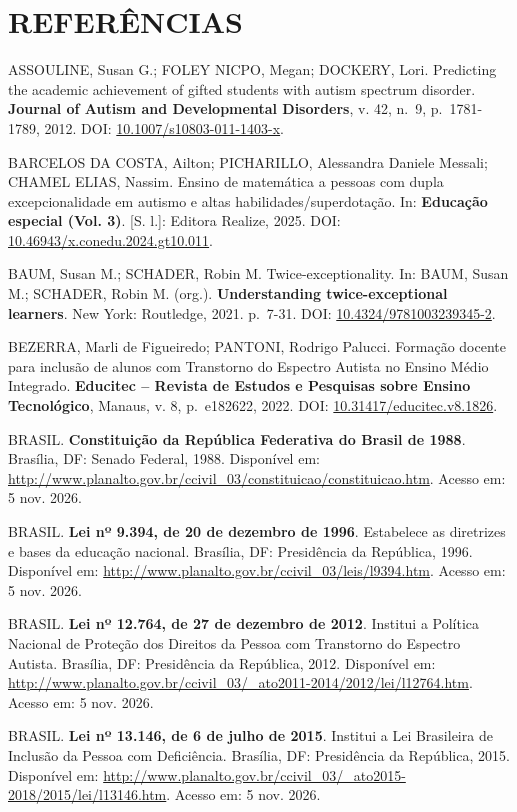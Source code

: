 \section*{REFERÊNCIAS}\label{referuxeancias}

ASSOULINE, Susan G.; FOLEY NICPO, Megan; DOCKERY, Lori. Predicting the
academic achievement of gifted students with autism spectrum disorder.
\textbf{Journal of Autism and Developmental Disorders}, v. 42, n.~9,
p.~1781-1789, 2012. DOI: \url{10.1007/s10803-011-1403-x}.

BARCELOS DA COSTA, Ailton; PICHARILLO, Alessandra Daniele Messali;
CHAMEL ELIAS, Nassim. Ensino de matemática a pessoas com dupla
excepcionalidade em autismo e altas habilidades/superdotação. In:
\textbf{Educação especial (Vol. 3)}. {[}S. l.{]}: Editora Realize, 2025.
DOI: \url{10.46943/x.conedu.2024.gt10.011}.

BAUM, Susan M.; SCHADER, Robin M. Twice-exceptionality. In: BAUM, Susan
M.; SCHADER, Robin M. (org.). \textbf{Understanding twice-exceptional
learners}. New York: Routledge, 2021. p.~7-31. DOI:
\url{10.4324/9781003239345-2}.

BEZERRA, Marli de Figueiredo; PANTONI, Rodrigo Palucci. Formação docente
para inclusão de alunos com Transtorno do Espectro Autista no Ensino
Médio Integrado. \textbf{Educitec -- Revista de Estudos e Pesquisas
sobre Ensino Tecnológico}, Manaus, v. 8, p.~e182622, 2022. DOI:
\url{10.31417/educitec.v8.1826}.

BRASIL. \textbf{Constituição da República Federativa do Brasil de 1988}.
Brasília, DF: Senado Federal, 1988. Disponível em:
\url{http://www.planalto.gov.br/ccivil_03/constituicao/constituicao.htm}.
Acesso em: 5 nov. 2026.

BRASIL. \textbf{Lei nº 9.394, de 20 de dezembro de 1996}. Estabelece as
diretrizes e bases da educação nacional. Brasília, DF: Presidência da
República, 1996. Disponível em:
\url{http://www.planalto.gov.br/ccivil_03/leis/l9394.htm}. Acesso em: 5 nov.
2026.

BRASIL. \textbf{Lei nº 12.764, de 27 de dezembro de 2012}. Institui a
Política Nacional de Proteção dos Direitos da Pessoa com Transtorno do
Espectro Autista. Brasília, DF: Presidência da República, 2012.
Disponível em:
\url{http://www.planalto.gov.br/ccivil_03/_ato2011-2014/2012/lei/l12764.htm}.
Acesso em: 5 nov. 2026.

BRASIL. \textbf{Lei nº 13.146, de 6 de julho de 2015}. Institui a Lei
Brasileira de Inclusão da Pessoa com Deficiência. Brasília, DF:
Presidência da República, 2015. Disponível em:
\url{http://www.planalto.gov.br/ccivil_03/_ato2015-2018/2015/lei/l13146.htm}.
Acesso em: 5 nov. 2026.

